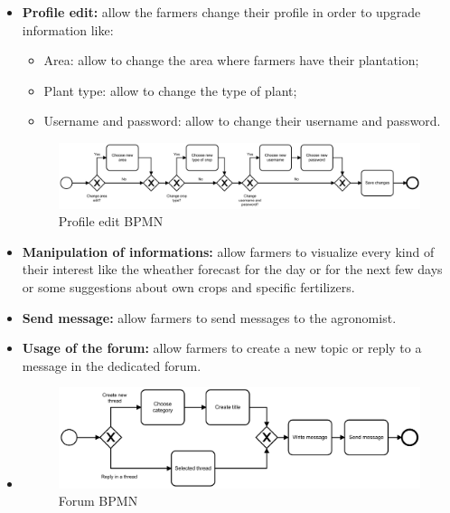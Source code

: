 \documentclass[table, 12pt]{article}
\begin{document}
\begin{itemize}
    \item \textbf{Profile edit: }allow the farmers change their profile in order to upgrade information like: 
    \begin{itemize}
        \item[] Area: allow to change the area where farmers have their plantation;
        \item[] Plant type: allow to change the type of plant;
        \item[] Username and password: allow to change their username and password.
    \end{itemize}
    \begin{center}
        \begin{figure}[!h]
            \includegraphics[width=\textwidth]{assets/BPMN/ProfileEditBpmn}
            \caption{Profile edit BPMN}
            \label{fig: profileedit}
        \end{figure}
    \end{center}
    \item \textbf{Manipulation of informations: }allow farmers to visualize every kind of their interest like the wheather forecast for the day or for the next few days or some suggestions about own crops and specific fertilizers.
    \item \textbf{Send message: }allow farmers to send messages to the agronomist.
    \item \textbf{Usage of the forum: }allow farmers to create a new topic or reply to a message in the dedicated forum.
    \item \begin{center}
        \begin{figure}[!h]
            \includegraphics[width=\textwidth]{assets/BPMN/ForumBpmn}
            \caption{Forum BPMN}
            \label{fig: forum}
        \end{figure}
    \end{center}
\end{itemize}
\end{document}
